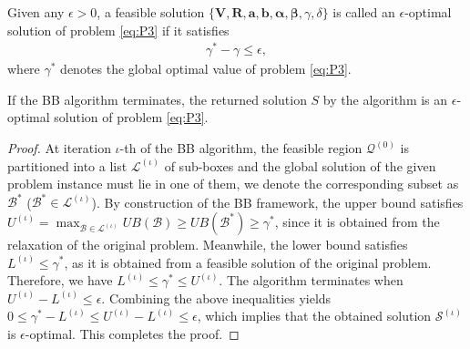 \documentclass[runningheads]{llncs}
\begin{document}
\begin{definition}
Given any $\epsilon > 0$, a feasible solution 
$\{ \mathbf{V}, \mathbf{R}, \mathbf{a}, \mathbf{b}, \boldsymbol{\alpha}, \boldsymbol{\beta}, \gamma, \delta \}$ 
is called an $\epsilon$-optimal solution of problem \eqref{eq:P3} if it satisfies
\begin{align}
\gamma^* - \gamma \le \epsilon,
\end{align}
where $\gamma^*$ denotes the global optimal value of problem \eqref{eq:P3}.
\end{definition}
\begin{theorem}
If the BB algorithm terminates, the returned solution $S$ by the algorithm is an $\epsilon$-optimal solution of problem \eqref{eq:P3}.
\end{theorem}
\begin{proof}
At iteration $\iota$-th of the BB algorithm, the feasible region $\mathcal{Q}^{(0)}$ is partitioned into a list $\mathcal{L}^{(\iota)} $ of sub-boxes and the global solution of the given problem instance must lie in one of them, we denote the corresponding subset as $\mathcal{B^*}$ ($\mathcal{B}^* \in \mathcal{L}^{(\iota)}$). By construction of the BB framework, the upper bound satisfies $ U^{(\iota)} = \max_{\mathcal{B} \in \mathcal{L^{(\iota)}}} UB (\mathcal{B}) \ge UB (\mathcal{B}^*) \ge \gamma^*$, since it is obtained from the relaxation of the original problem. Meanwhile, the lower bound satisfies $L^{(\iota)} \le \gamma^*$, as it is obtained from a feasible solution of the original problem. Therefore, we have $L^{(\iota)} \le \gamma^* \le U^{(\iota)}$. The algorithm terminates when $U^{(\iota)} - L^{(\iota)} \le \epsilon$. Combining the above inequalities yields $0 \le \gamma^* - L^{(\iota)} \le U^{(\iota)} - L^{(\iota)} \le \epsilon$, which implies that the obtained solution $\mathcal{S}^{(\iota)} $ is $\epsilon$-optimal. This completes the proof.
\end{proof} 
\end{document}
